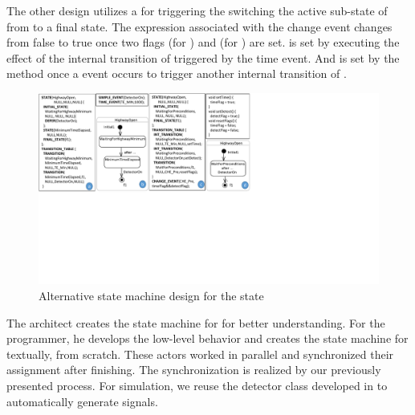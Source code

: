 The other design utilizes a  for triggering the switching the active sub-state of  from  to a final state. 
The expression associated with the change event changes from false to true once two flags  (for ) and  (for ) are set. 
 is set by executing the effect  of the internal transition of  triggered by the  time event. 
And  is set by the method  once a  event occurs to trigger another internal transition of .
\begin{figure}
	\centering
	\includegraphics[clip, trim=0.0cm 9.3cm 12.7cm 0cm, width=\columnwidth]{figures/highwayopenalternatives}
	\caption{Alternative state machine design for the  state} 
	\label{fig:highwayopenalternatives}
\end{figure}

The architect creates the state machine for  
for better understanding.
For the programmer, he 
develops the low-level behavior and creates the state machine for  textually, from scratch.
These actors worked in parallel and synchronized their assignment after finishing.
The synchronization is realized by our previously presented process.
For simulation, we reuse the detector class developed in \cite{farmroadexample} to automatically generate  signals. 




